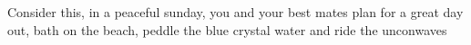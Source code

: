Consider this, in a peaceful sunday, you and your best mates plan for a great day out, bath on the beach, peddle the blue crystal water and ride the unconwaves 